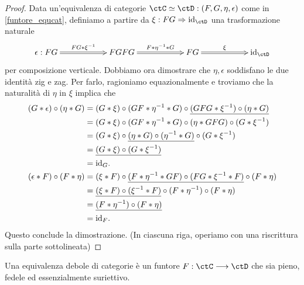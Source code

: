 \begin{proof}
	Data un'equivalenza di categorie \(\ctC\simeq\ctD : (F,G,\eta,\epsilon)\) come in \ref{funtore_equcat}, definiamo a partire da \(\xi : FG\nat \Id[\ctD]\) una trasformazione naturale
	\[\xymatrix@C=2cm{
		\epsilon : FG \ar@{=>}[r]^-{FG\whi \xi^{-1}} & FGFG \ar@{=>}[r]^-{F\whi\eta^{-1}\whi G} & FG \ar@{=>}[r]^-\xi & \Id[\ctD]
		}\]
	per composizione verticale. Dobbiamo ora dimostrare che \(\eta,\epsilon\) soddisfano le due identità zig e zag. Per farlo, ragioniamo equazionalmente e troviamo che la naturalità di \(\eta\) in \(\xi\) implica che
	\begin{align*}
		(G\whi\epsilon)\cmp(\eta \whi G) & = (G\whi\xi )\cmp(GF\whi\eta^{-1}\whi G)\cmp\underline{(GFG\whi\xi^{-1})\cmp(\eta\whi G)}      \\
		                                 & = (G\whi\xi )\cmp(GF\whi\eta^{-1}\whi G)\cmp(\eta\whi GFG)\cmp(G\whi \xi^{-1})                 \\
		                                 & = (G\whi\xi )\cmp\underline{(\eta\whi G)\cmp(\eta^{-1}\whi G)}\cmp(G\whi \xi^{-1})             \\
		                                 & = \underline{(G\whi\xi )\cmp(G\whi \xi^{-1})}                                                  \\
		                                 & =\Id[G].                                                                                       \\
		(\epsilon\whi F)\cmp(F\whi\eta)  & = (\xi\whi F)\cmp\underline{(F\whi\eta^{-1}\whi GF)\cmp(FG\whi \xi^{-1}\whi F)}\cmp(F\whi\eta) \\
		                                 & = \underline{(\xi\whi F)\cmp(\xi^{-1}\whi F)}\cmp(F\whi\eta^{-1})\cmp(F\whi\eta)               \\
		                                 & = \underline{(F\whi\eta^{-1})\cmp(F\whi\eta)}                                                  \\
		                                 & = \Id[F].
	\end{align*}
	Questo conclude la dimostrazione. (In ciascuna riga, operiamo con una riscrittura sulla parte sottolineata)
\end{proof}
\begin{definition}\label{funtore_wequcat}
	Una equivalenza debole di categorie è un funtore \(F : \ctC \fun\ctD\) che sia pieno, fedele ed essenzialmente suriettivo.
\end{definition}
